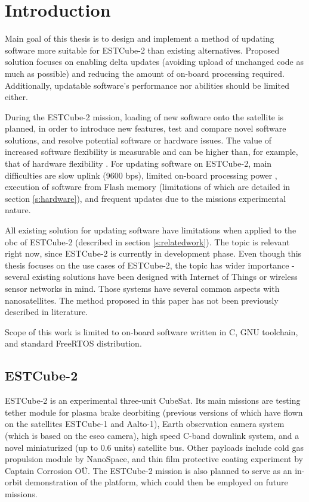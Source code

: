\newpage
\section{Introduction}

Main goal of this thesis is to design and implement a method of updating software more suitable for ESTCube-2 than existing alternatives. Proposed solution focuses on enabling delta updates (avoiding upload of unchanged code as much as possible) and reducing the amount of on-board processing required. Additionally, updatable software's performance nor abilities should be limited either.

During the ESTCube-2 mission, loading of new software onto the satellite is planned, in order to introduce new features, test and compare novel software solutions, and resolve potential software or hardware issues. The value of increased software flexibility is measurable and can be higher than, for example, that of hardware flexibility \cite{Nilchiani2009}. For updating software on ESTCube-2, main difficulties are slow uplink (9600 bps), limited on-board processing power \cite{Ehrpais2016}, execution of software from Flash memory \cite{Haljaste2017} (limitations of which are detailed in section \ref{s:hardware}), and frequent updates due to the missions experimental nature.

All existing solution for updating software have limitations when applied to the \gls{obc} of ESTCube-2 (described in section \ref{s:relatedwork}). The topic is relevant right now, since ESTCube-2 is currently in development phase. Even though this thesis focuses on the use cases of ESTCube-2, the topic has wider importance - several existing solutions have been designed with Internet of Things or wireless sensor networks \cite{Dunkels2006,Han2005} in mind. Those systems have several common aspects with nanosatellites. The method proposed in this paper has not been previously described in literature.

Scope of this work is limited to on-board software written in C, GNU toolchain, and standard FreeRTOS distribution.

\subsection{ESTCube-2}

ESTCube-2 is an experimental three-unit CubeSat. Its main missions are testing tether module for plasma brake deorbiting (previous versions of which have flown on the satellites ESTCube-1 and Aalto-1), Earth observation camera system (which is based on the \gls{eseo} camera), high speed C-band downlink system, and a novel miniaturized (up to 0.6 units) satellite bus. Other payloads include cold gas propulsion module by NanoSpace, and thin film protective coating experiment by Captain Corrosion OÜ. The ESTCube-2 mission is also planned to serve as an in-orbit demonstration of the platform, which could then be employed on future missions. \cite{Iakubivskyi2016}

